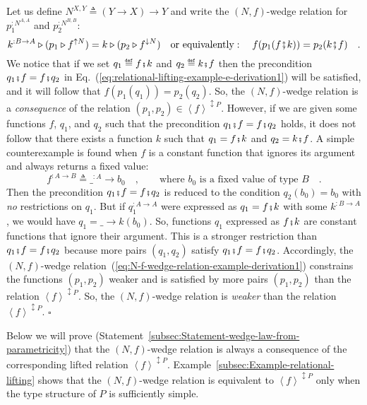 Let us define $N^{X,Y}\triangleq\left(Y\rightarrow X\right)\rightarrow Y$
and write the $\left(N,f\right)$-wedge relation for $p_{1}^{:N^{A,A}}$
and $p_{2}^{:N^{B,B}}$:
\begin{equation}
k^{:B\rightarrow A}\triangleright(p_{1}\triangleright f^{\uparrow N})=k\triangleright(p_{2}\triangleright f^{\downarrow N})\quad\text{or equivalently}:\quad f(p_{1}(f\bef k))=p_{2}(k\bef f)\quad.\label{eq:N-f-wedge-relation-example-derivation1}
\end{equation}
We notice that if we set $q_{1}\triangleq f\bef k$ and $q_{2}\triangleq k\bef f$
then the precondition $q_{1}\bef f=f\bef q_{2}$ in Eq.~(\ref{eq:relational-lifting-example-e-derivation1})
will be satisfied, and it will follow that $f(p_{1}(q_{1}))=p_{2}(q_{2})$.
So, the $\left(N,f\right)$-wedge relation is a \emph{consequence}
of the relation $(p_{1},p_{2})\in\left<f\right>^{\updownarrow P}$.
However, if we are given some functions $f$, $q_{1}$, and $q_{2}$
such that the precondition $q_{1}\bef f=f\bef q_{2}$ holds, it does
not follow that there exists a function $k$ such that $q_{1}=f\bef k$
and $q_{2}=k\bef f$. A simple counterexample is found when $f$ is
a constant function that ignores its argument and always returns a
fixed value:
\[
f^{:A\rightarrow B}\triangleq\_^{:A}\rightarrow b_{0}\quad,\quad\quad\text{where }b_{0}\text{ is a fixed value of type }B\quad.
\]
Then the precondition $q_{1}\bef f=f\bef q_{2}$ is reduced to the
condition $q_{2}(b_{0})=b_{0}$ with \emph{no} restrictions on $q_{1}$.
But if $q_{1}^{:A\rightarrow A}$ were expressed as $q_{1}=f\bef k$
with some $k^{:B\rightarrow A}$, we would have $q_{1}=\_\rightarrow k(b_{0})$.
So, functions $q_{1}$ expressed as $f\bef k$ are constant functions
that ignore their argument. This is a stronger restriction than $q_{1}\bef f=f\bef q_{2}$
because more pairs $\left(q_{1},q_{2}\right)$ satisfy $q_{1}\bef f=f\bef q_{2}$.
Accordingly, the $\left(N,f\right)$-wedge relation~(\ref{eq:N-f-wedge-relation-example-derivation1})
constrains the functions $\left(p_{1},p_{2}\right)$ weaker and is
satisfied by more pairs $\left(p_{1},p_{2}\right)$ than the relation
$\left<f\right>^{\updownarrow P}$. So, the $\left(N,f\right)$-wedge
relation is\emph{ weaker} than the relation $\left<f\right>^{\updownarrow P}$.
$\square$

Below we will prove (Statement~\ref{subsec:Statement-wedge-law-from-parametricity})
that the $\left(N,f\right)$-wedge relation is always a consequence
of the corresponding lifted relation $\left<f\right>^{\updownarrow P}$.
Example~\ref{subsec:Example-relational-lifting} shows that the $\left(N,f\right)$-wedge
relation is equivalent to $\left<f\right>^{\updownarrow P}$ only
when the type structure of $P$ is sufficiently simple.

